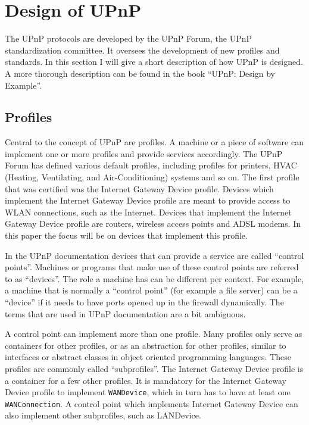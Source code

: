 \documentclass[10pt]{article}
\begin{document}
\section{Design of UPnP}

The UPnP protocols are developed by the UPnP Forum\cite{upnpforum}, the
UPnP standardization committee. It oversees the development of new profiles
and standards. In this section I will give a short description of how UPnP is
designed. A more thorough description can be found in the book ``UPnP: Design
by Example''\cite{intel}.

\subsection{Profiles}

Central to the concept of UPnP are profiles. A machine or a piece of software
can implement one or more profiles and provide services accordingly. The UPnP
Forum has defined various default profiles, including profiles for printers,
HVAC (Heating, Ventilating, and Air-Conditioning) systems and so on. The first
profile that was certified was the Internet Gateway Device profile. Devices
which implement the Internet Gateway Device profile are meant to provide
access to WLAN connections, such as the Internet. Devices that implement the
Internet Gateway Device profile are routers, wireless access points and ADSL
modems. In this paper the focus will be on devices that implement this profile.

In the UPnP documentation devices that can provide a service are called
``control points''. Machines or programs that make use of these control
points are referred to as ``devices''. The role a machine has can be
different per context. For example, a machine that is normally a ``control
point'' (for example a file server) can be a ``device'' if it needs to have
ports opened up in the firewall dynamically. The terms that are used in UPnP
documentation are a bit ambiguous.

A control point can implement more than one profile. Many profiles only
serve as containers for other profiles, or as an abstraction for other
profiles, similar to interfaces or abstract classes in object oriented
programming languages. These profiles are commonly called ``subprofiles''.
The Internet Gateway Device profile is a container for a few other profiles.
It is mandatory for the Internet Gateway Device profile to implement 
\texttt{WANDevice}, which in turn has to have at least one
\texttt{WANConnection}. A control point which implements Internet Gateway
Device can also implement other subprofiles, such as LANDevice.
\end{document}
